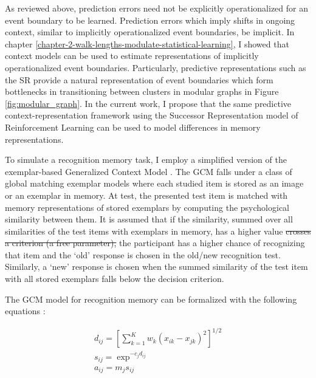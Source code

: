 As reviewed above, prediction errors need not be explicitly operationalized for an event boundary to be learned. Prediction errors which imply shifts in ongoing context, similar to implicitly operationalized event boundaries,  be implicit. In chapter \ref{chapter-2-walk-lengths-modulate-statistical-learning}, I showed that context models can be used to estimate representations of implicitly operationalized event boundaries. Particularly, predictive representations such as the SR provide a natural representation of event boundaries which form bottlenecks in transitioning between clusters in modular graphs in Figure \ref{fig:modular_graph}. In the current work, I propose that the same predictive context-representation framework using the Successor Representation model of Reinforcement Learning \cite{dayan1993improving, momennejad2017successor, russek2017predictive, momennejad2020learning,gershman2012successor} can be used to model differences in memory representations. 

To simulate a recognition memory task, I employ a simplified version of the exemplar-based Generalized Context Model \cite{nosofsky2011generalized,nosofsky1986attention, nosofsky2011short}. The GCM falls under a class of global matching exemplar models where each studied item is stored as an image or an exemplar in memory. At test, the presented test item is matched with memory representations of stored exemplars by computing the psychological similarity between them. It is assumed that if the similarity, summed over all similarities of the test items with exemplars in memory, \ac{has a higher value} \st{crosses a criterion (a free parameter),} the participant \ac{has a higher chance of recognizing} that item and the `old' response is chosen in the old/new recognition test. Similarly, a `new' response is chosen when the summed similarity of the test item with all stored exemplars falls below the decision criterion. 

The GCM model for recognition memory can be formalized with the following equations \cite{nosofsky2011short}:

\begin{equation}
    \begin{aligned}
        d_{ij} = [\sum\limits_{k = 1}^K w_k(x_{ik} - x_{jk})^2]^{1/2} \\
        s_{ij} = \exp^{-c_jd_{ij}} \\
        a_{ij} = m_js_{ij}
    \end{aligned}
\end{equation}    

